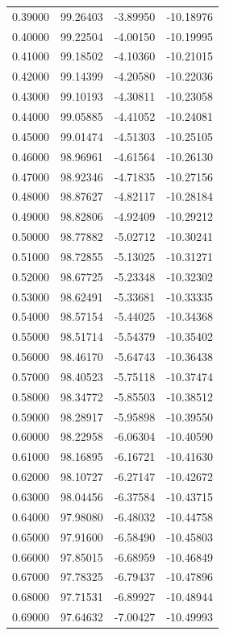 \begin{table}
\begin{tabular}{llll}
0.39000 & 99.26403 & -3.89950 & -10.18976 \\
0.40000 & 99.22504 & -4.00150 & -10.19995 \\
0.41000 & 99.18502 & -4.10360 & -10.21015 \\
0.42000 & 99.14399 & -4.20580 & -10.22036 \\
0.43000 & 99.10193 & -4.30811 & -10.23058 \\
0.44000 & 99.05885 & -4.41052 & -10.24081 \\
0.45000 & 99.01474 & -4.51303 & -10.25105 \\
0.46000 & 98.96961 & -4.61564 & -10.26130 \\
0.47000 & 98.92346 & -4.71835 & -10.27156 \\
0.48000 & 98.87627 & -4.82117 & -10.28184 \\
0.49000 & 98.82806 & -4.92409 & -10.29212 \\
0.50000 & 98.77882 & -5.02712 & -10.30241 \\
0.51000 & 98.72855 & -5.13025 & -10.31271 \\
0.52000 & 98.67725 & -5.23348 & -10.32302 \\
0.53000 & 98.62491 & -5.33681 & -10.33335 \\
0.54000 & 98.57154 & -5.44025 & -10.34368 \\
0.55000 & 98.51714 & -5.54379 & -10.35402 \\
0.56000 & 98.46170 & -5.64743 & -10.36438 \\
0.57000 & 98.40523 & -5.75118 & -10.37474 \\
0.58000 & 98.34772 & -5.85503 & -10.38512 \\
0.59000 & 98.28917 & -5.95898 & -10.39550 \\
0.60000 & 98.22958 & -6.06304 & -10.40590 \\
0.61000 & 98.16895 & -6.16721 & -10.41630 \\
0.62000 & 98.10727 & -6.27147 & -10.42672 \\
0.63000 & 98.04456 & -6.37584 & -10.43715 \\
0.64000 & 97.98080 & -6.48032 & -10.44758 \\
0.65000 & 97.91600 & -6.58490 & -10.45803 \\
0.66000 & 97.85015 & -6.68959 & -10.46849 \\
0.67000 & 97.78325 & -6.79437 & -10.47896 \\
0.68000 & 97.71531 & -6.89927 & -10.48944 \\
0.69000 & 97.64632 & -7.00427 & -10.49993 \\

\end{tabular}
\end{table}
